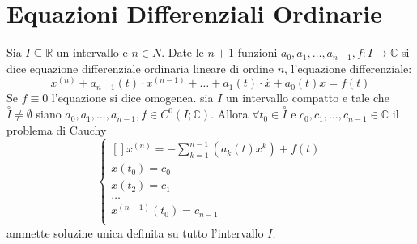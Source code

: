 \section{Equazioni Differenziali Ordinarie}
Sia $I\subseteq\mathbb{R}$ un intervallo e $n\in N$. Date le $n+1$ funzioni $a_0,a_1,\ldots,a_{n-1}, f:I\to\mathbb{C}$ si dice equazione differenziale ordinaria lineare di ordine $n$, l'equazione differenziale:
$$x^{(n)}+a_{n-1}(t)\cdot x^{(n-1)}+\ldots+a_1(t)\cdot\overset{\cdot}{x}+a_0(t)x=f(t)$$
Se $f\equiv 0 $ l'equazione si dice omogenea.
\proposition
sia $I$ un intervallo compatto e tale che $\overset{\circ}{I}\ne \emptyset$ siano $a_0,a_1,\ldots,a_{n-1},f\in C^0(I;\mathbb{C})$. Allora $\forall t_0\in\overset{\circ}{I}$ e $c_0,c_1,\ldots,c_{n-1}\in\mathbb{C}$ il problema di Cauchy 
$$ \left\{\begin{matrix}[]
x^{(n)}=-\sum\limits_{k=1}^{n-1}\left(a_k(t)x^k\right)+f(t)\\
x(t_0)=c_0\\
x(t_2)=c_1\\
\ldots\\
x^{(n-1)}(t_0)=c_{n-1}\\
\end{matrix}\right.$$
ammette soluzine unica definita su tutto l'intervallo $I$.
